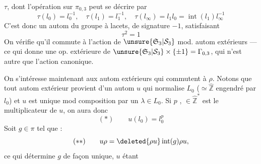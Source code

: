 $\tau$, dont l'opération sur $\pi_{0,3}$ peut se décrire par
\[
\tau(l_0)=l_0^{-1},\quad\tau(l_1)=l_1^{-1},\quad\tau(l_\infty)=l_1l_0=\operatorname{int}(l_1)l_\infty^{-1}
\]
C'est donc un autom du groupe à lacets, de signature $-1$, satisfaisant
\[
\tau^2=1
\]
On vérifie qu'il commute à l'action de $\unsure{\mathfrak S_3|\mathcal S_3}$ mod. autom extérieurs --- ce qui donne une op. extérieure de $\unsure{\mathfrak S_3|\mathcal S_3}\times\{\pm1\}=\Gamma_{0,3}$, qui n'est autre que l'action canonique.

On s'intéresse maintenant aux autom extérieurs qui commutent à $\rho$. Notons que tout autom extérieur  provient d'un autom $u$ qui normalise  $L_0$ ($\simeq\hat{\mathbb Z}$ engendré par $l_0$) et $u$ est unique mod composition par un $\lambda\in L_0$. Si $p$ , $\in\hat{\mathbb Z}^{*}$  est le multiplicateur de $u$, on aura donc
\[
(*)\qquad u(l_0)=l_0^p
\]
Soit $g\in\pi$ tel que :
\[
(**)\qquad u\rho=\deleted{\rho u}\operatorname{int}(g)\rho u,
\]
ce qui détermine $g$ de façon unique, $u$ étant
